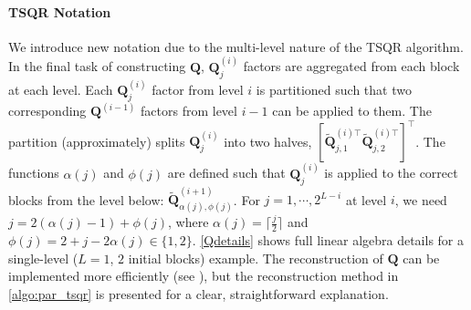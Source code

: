 \documentclass[review,onefignum,onetabnum]{siamart190516}
\newcommand{\bb}[1]{\mathbf{#1}}
\begin{document}
\paragraph{TSQR Notation}
We introduce new notation due to the multi-level nature of the TSQR algorithm.
In the final task of constructing $\bb{Q}$, $\bb{Q}_j^{(i)}$ factors are aggregated from each block at each level.
Each $\bb{Q}_j^{(i)}$ factor from level $i$ is partitioned such that two corresponding $\bb{Q}^{(i-1)}$ factors from level $i-1$ can be applied to them. 
The partition (approximately) splits $\bb{Q}_{j}^{(i)}$ into two halves, $[\tilde{\bb{Q}}_{j, 1}^{(i)\top} \tilde{\bb{Q}}_{j, 2}^{(i)\top}]^{\top}$.
The functions $\alpha(j)$ and $\phi(j)$ are defined such that $\bb{Q}_j^{(i)}$ is applied to the correct blocks from the level below: $\tilde{\bb{Q}}_{\alpha(j), \phi(j)}^{(i+1)}$.
For $j = 1 , \cdots, 2^{L-i}$ at level $i$, we need $j = 2(\alpha(j)-1) + \phi(j)$, where $\alpha(j) = \lceil \frac{j}{2}\rceil$ and $\phi(j) = 2 + j - 2\alpha(j) \in\{1,2\}$.
\cref{Qdetails} shows full linear algebra details for a single-level ($L=1$, $2$ initial blocks) example.
The reconstruction of $\bb{Q}$ can be implemented more efficiently (see \cite{BDGJNS2014}), but the reconstruction method in \cref{algo:par_tsqr} is presented for a clear, straightforward explanation.


\end{document}
